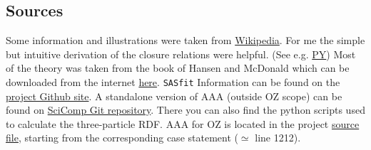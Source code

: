 \documentclass[11pt,a4paper]{article}
\begin{document}
\subsection{Sources}
Some information and illustrations were taken from \href{https://en.wikipedia.org/wiki/Radial_distribution_function}{Wikipedia}.
For me the simple but intuitive derivation of the closure relations were helpful. 
(See e.g. \href{https://en.wikipedia.org/wiki/Percus%E2%80%93Yevick_approximation}{PY})
\newline
Most of the theory was taken from the book of Hansen and McDonald \cite{hansen2006theory} which can be downloaded
from the internet \href{http://www.sciencedirect.com/science/book/9780123705358}{here}. 
\newline
\texttt{SASfit} Information can be found on the  
\href{https://github.com/SASfit/SASfit}{project Github site}.
\newline
A standalone version of AAA (outside OZ scope) can be found on 
\href{https://git.psi.ch/SciComp/AndersonAcc4OZ/blob/master/src/AA.c}{SciComp Git repository}. There you can also find 
the python scripts used to calculate the three-particle RDF.
\newline
AAA for OZ is located in the project
\href{https://github.com/SASfit/SASfit/blob/master/src/sasfit_oz/sasfit_oz_solver.c}{source file},
starting from the corresponding case statement ($\simeq$ line 1212).
\end{document}

